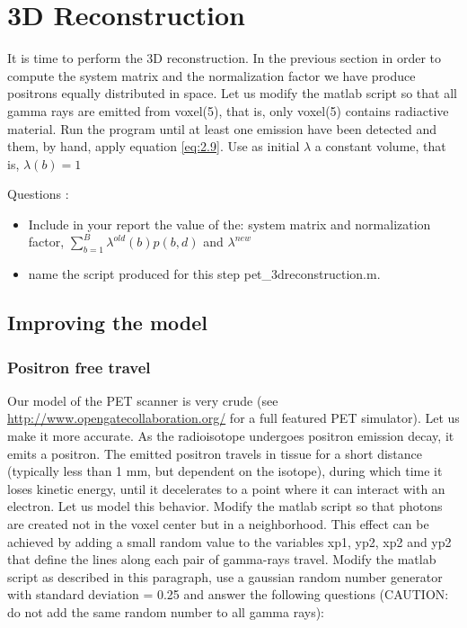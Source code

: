 \documentclass[12pt]{article} %
\newcounter{ejercicioNo}
\begin{document}
\section{3D Reconstruction}

It is time to perform the 3D reconstruction. In the previous section in order to compute the system matrix and the normalization factor we have produce positrons equally distributed in space. Let us modify the matlab script so that all gamma rays are emitted from voxel(5), that is, only voxel(5) contains radiactive material. Run the program until at least one emission have been detected and them, by hand, apply equation \ref{eq:2.9}. Use as initial $\lambda$ a constant volume, that is, $\lambda(b)=1$

\begin{minipage}{\linewidth}
\begin{framed}
\addtocounter{ejercicioNo}{1} 
Questions : 
\begin{itemize}
   \item Include in your report the value of the: system matrix and normalization factor, $\sum_{b=1}^{B}\lambda^{old}\left(b\right)p(b,d)$ and $\lambda^{new}$
   \item name the script produced for this step pet\_3dreconstruction.m.
\end{itemize}
\end{framed}
\end{minipage}


\subsection{Improving the model}
\label{sec:ImprovingTheModel}
\subsubsection{Positron free travel}
\label{sec:PositronFreeTravel}

Our model of the PET scanner is very crude 
(see \url{http://www.opengatecollaboration.org/} for a full featured PET simulator). Let us make it 
more accurate. As the radioisotope undergoes positron emission decay, it emits a positron. The emitted positron travels in tissue for a short distance (typically less than 1 mm, but dependent on the isotope), during which time it loses kinetic energy, until it decelerates to a point where it can interact with an electron. Let us model this behavior. Modify the matlab script so that photons are created not in the voxel center but in a neighborhood. This effect can be achieved by adding a small random value to the variables xp1, yp2, xp2 and yp2 that define the lines along each pair of gamma-rays travel. Modify the matlab script as described in this paragraph, use a gaussian random number generator with standard deviation = 0.25  and answer the following questions (CAUTION: do not add the same random number to all gamma rays):
\end{document}
